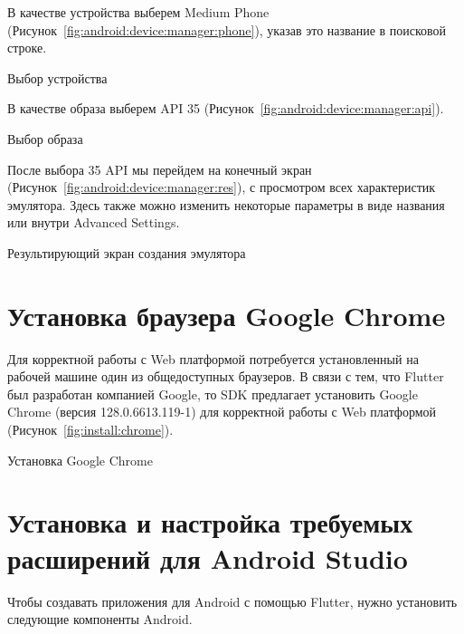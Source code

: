 В качестве устройства выберем Medium Phone
(Рисунок~\ref{fig:android:device:manager:phone}),
указав это название в поисковой строке.

\begin{image}
	\caption{Выбор устройства}
	\label{fig:android:device:manager:phone}
\end{image}

В качестве образа выберем API 35
(Рисунок~\ref{fig:android:device:manager:api}).

\begin{image}
	\caption{Выбор образа}
	\label{fig:android:device:manager:api}
\end{image}

После выбора 35 API мы перейдем на конечный экран
(Рисунок~\ref{fig:android:device:manager:res}),
с просмотром всех характеристик эмулятора.
Здесь также можно изменить некоторые параметры в виде названия
или внутри Advanced Settings.

\begin{image}
	\caption{Результирующий экран создания эмулятора}
	\label{fig:android:device:manager:res}
\end{image}

\section{Установка браузера Google Chrome}

Для корректной работы с Web платформой потребуется установленный
на рабочей машине один из общедоступных браузеров.
В связи с тем, что Flutter был разработан компанией Google,
то SDK предлагает установить Google Chrome (версия 128.0.6613.119-1)
для корректной работы с Web платформой (Рисунок~\ref{fig:install:chrome}).

\begin{image}
	\caption{Установка Google Chrome}
	\label{fig:install:chrome}
\end{image}

\section{Установка и настройка требуемых расширений для Android Studio}

Чтобы создавать приложения для Android с помощью Flutter,
нужно установить следующие компоненты Android.

